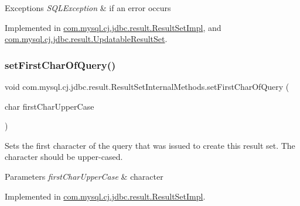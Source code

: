 \begin{DoxyExceptions}{Exceptions}
{\em S\+Q\+L\+Exception} & if an error occurs \\
\hline
\end{DoxyExceptions}


Implemented in \mbox{\hyperlink{classcom_1_1mysql_1_1cj_1_1jdbc_1_1result_1_1_result_set_impl_a33dfcef00d2e567cee58610ade647321}{com.\+mysql.\+cj.\+jdbc.\+result.\+Result\+Set\+Impl}}, and \mbox{\hyperlink{classcom_1_1mysql_1_1cj_1_1jdbc_1_1result_1_1_updatable_result_set_aa7c422ba94c2a8a8727c57160bd946bd}{com.\+mysql.\+cj.\+jdbc.\+result.\+Updatable\+Result\+Set}}.

\mbox{\label{interfacecom_1_1mysql_1_1cj_1_1jdbc_1_1result_1_1_result_set_internal_methods_a0cf0d8b631bb6bc7a7453ee35399889f}} 
\subsubsection{\texorpdfstring{set\+First\+Char\+Of\+Query()}{setFirstCharOfQuery()}}
{\footnotesize\ttfamily void com.\+mysql.\+cj.\+jdbc.\+result.\+Result\+Set\+Internal\+Methods.\+set\+First\+Char\+Of\+Query (\begin{DoxyParamCaption}\item[{char}]{first\+Char\+Upper\+Case }\end{DoxyParamCaption})}

Sets the first character of the query that was issued to create this result set. The character should be upper-\/cased.


\begin{DoxyParams}{Parameters}
{\em first\+Char\+Upper\+Case} & character \\
\hline
\end{DoxyParams}


Implemented in \mbox{\hyperlink{classcom_1_1mysql_1_1cj_1_1jdbc_1_1result_1_1_result_set_impl_ac9fac0fdfce19c2d4a1cb5ff55e03ec5}{com.\+mysql.\+cj.\+jdbc.\+result.\+Result\+Set\+Impl}}.

